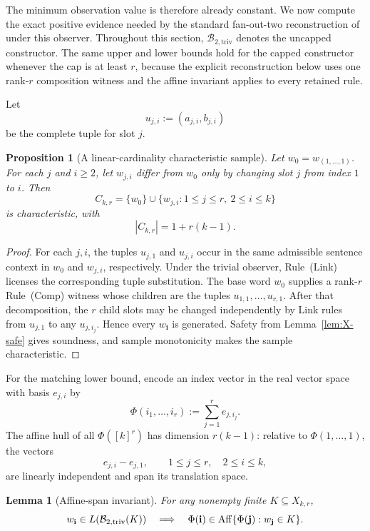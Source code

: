 \documentclass[11pt]{article}
\newtheorem{proposition}[theorem]{Proposition}
\newtheorem{lemma}[theorem]{Lemma}
\theoremstyle{definition}
\theoremstyle{remark}
\begin{document}
The minimum observation value is therefore already constant.  We now compute
the exact positive evidence needed by the standard fan-out-two reconstruction
of \cite{KuriyamaMCFG} under this observer.  Throughout this section,
\(\mathcal B_{2,\mathrm{triv}}\) denotes the uncapped constructor.  The same
upper and lower bounds hold for the capped constructor whenever the cap is at
least \(r\), because the explicit reconstruction below uses one rank-\(r\)
composition witness and the affine invariant applies to every retained rule.

Let
\[
 u_{j,i}:=(a_{j,i},b_{j,i})
\]
be the complete tuple for slot \(j\).

\begin{proposition}[A linear-cardinality characteristic sample]
\label{prop:X-upper}
Let \(w_0=w_{(1,\ldots,1)}\).  For each \(j\) and \(i\ge2\), let
\(w_{j,i}\) differ from \(w_0\) only by changing slot \(j\) from index \(1\)
to \(i\).  Then
\[
 C_{k,r}
 =
 \{w_0\}\cup
 \{w_{j,i}:1\le j\le r,\ 2\le i\le k\}
\]
is characteristic, with
\[
 |C_{k,r}|=1+r(k-1).
\]
\end{proposition}

\begin{proof}
For each \(j,i\), the tuples \(u_{j,1}\) and \(u_{j,i}\) occur in the same
admissible sentence context in \(w_0\) and \(w_{j,i}\), respectively.
Under the trivial observer, Rule~(Link) licenses the corresponding tuple
substitution.  The base word \(w_0\) supplies a rank-\(r\) Rule~(Comp)
witness whose children are the tuples \(u_{1,1},\ldots,u_{r,1}\).  After that
decomposition, the \(r\) child slots may be changed independently by Link
rules from \(u_{j,1}\) to any \(u_{j,i_j}\).  Hence every \(w_{\mathbf i}\)
is generated.  Safety from Lemma~\ref{lem:X-safe} gives soundness, and sample
monotonicity makes the sample characteristic.
\end{proof}

For the matching lower bound, encode an index vector in the real vector space
with basis \(e_{j,i}\) by
\[
 \Phi(i_1,\ldots,i_r)
 :=
 \sum_{j=1}^r e_{j,i_j}.
\]
The affine hull of all \(\Phi([k]^r)\) has dimension \(r(k-1)\):
relative to \(\Phi(1,\ldots,1)\), the vectors
\[
 e_{j,i}-e_{j,1},
 \qquad 1\le j\le r,\quad 2\le i\le k,
\]
are linearly independent and span its translation space.

\begin{lemma}[Affine-span invariant]
\label{lem:X-affine}
For any nonempty finite \(K\subseteq X_{k,r}\),
\[
 w_{\mathbf i}\in L(\mathcal B_{2,\rm triv}(K))
 \quad\Longrightarrow\quad
 \Phi(\mathbf i)\in\operatorname{Aff}\{\Phi(\mathbf j):w_{\mathbf j}\in K\}.
\]
\end{lemma}
\end{document}
